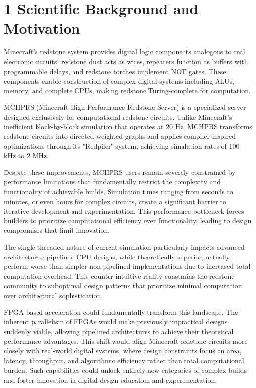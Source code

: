\documentclass[a4paper,11pt]{article}
\begin{document}
\clearpage

\pagestyle{plain}

\section*{1 Scientific Background and Motivation}

Minecraft's redstone system provides digital logic components analogous to real electronic circuits: redstone dust acts as wires, repeaters function as buffers with programmable delays, and redstone torches implement NOT gates.
These components enable construction of complex digital systems including ALUs, memory, and complete CPUs, making redstone Turing-complete for computation.

MCHPRS (Minecraft High-Performance Redstone Server) is a specialized server designed exclusively for computational redstone circuits.
Unlike Minecraft's inefficient block-by-block simulation that operates at 20 Hz, MCHPRS transforms redstone circuits into directed weighted graphs and applies compiler-inspired optimizations through its "Redpiler" system, achieving simulation rates of 100 kHz to 2 MHz.

Despite these improvements, MCHPRS users remain severely constrained by performance limitations that fundamentally restrict the complexity and functionality of achievable builds.
Simulation times ranging from seconds to minutes, or even hours for complex circuits, create a significant barrier to iterative development and experimentation.
This performance bottleneck forces builders to prioritize computational efficiency over functionality, leading to design compromises that limit innovation.

The single-threaded nature of current simulation particularly impacts advanced architectures: pipelined CPU designs, while theoretically superior, actually perform worse than simpler non-pipelined implementations due to increased total computation overhead.
This counter-intuitive reality constrains the redstone community to suboptimal design patterns that prioritize minimal computation over architectural sophistication.

FPGA-based acceleration could fundamentally transform this landscape.
The inherent parallelism of FPGAs would make previously impractical designs suddenly viable, allowing pipelined architectures to achieve their theoretical performance advantages.
This shift would align Minecraft redstone circuits more closely with real-world digital systems, where design constraints focus on area, latency, throughput, and algorithmic efficiency rather than total computational burden.
Such capabilities could unlock entirely new categories of complex builds and foster innovation in digital design education and experimentation.
\end{document}
